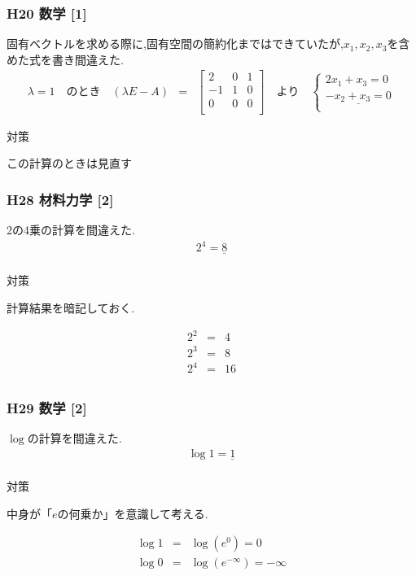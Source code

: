 \documentclass[a4paper]{jsarticle}
\begin{document}
\subsubsection{H20 数学 [1]}
固有ベクトルを求める際に,固有空間の簡約化まではできていたが,$x_1,x_2,x_3$を含めた式を書き間違えた.\\
\begin{eqnarray*}
    \lambda=1\quad のとき\quad
    \left(\lambda E - A\right)
    &=&
    \begin{bmatrix}
        2  & 0 & 1 \\
        -1 & 1 & 0 \\
        0  & 0 & 0 \\
    \end{bmatrix}
    \quad より\quad
    \begin{cases}
        {2x_1+x_3=0}             \\
        {\underline{-x_2+x_3=0}} \\
    \end{cases}
\end{eqnarray*}
\begin{itembox}[l]{対策}
    \begin{center}
        この計算のときは見直す
    \end{center}
\end{itembox}
\subsubsection{H28 材料力学 [2]}
2の4乗の計算を間違えた.
\begin{eqnarray*}
    2^4=\underline{8}\\
\end{eqnarray*}
\begin{itembox}[l]{対策}
    \begin{center}
        計算結果を暗記しておく.
    \end{center}
    \begin{eqnarray*}
        2^2&=&4\\
        2^3&=&8\\
        2^4&=&16\\
    \end{eqnarray*}
\end{itembox}
\subsubsection{H29 数学 [2]}
$\log$の計算を間違えた.
\begin{eqnarray*}
    \log 1 = \underline{1}\\
\end{eqnarray*}
\begin{itembox}[l]{対策}
    \begin{center}
        中身が「$e$の何乗か」を意識して考える.
    \end{center}
    \begin{eqnarray*}
        \log1&=&\log\left(e^0\right)=0\\
        \log0&=&\log\left(e^{-\infty}\right)=-\infty\\
    \end{eqnarray*}
\end{itembox}
\end{document}
